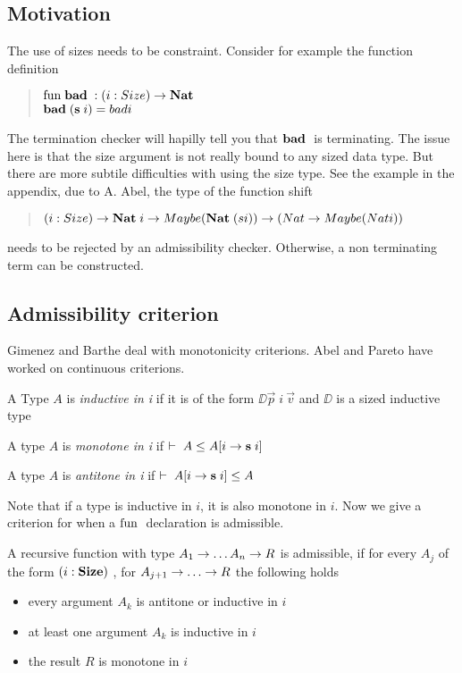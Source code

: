 \subsection{Motivation}
The use of sizes needs to be constraint.
Consider for example the function definition

\begin{quote}
$\mathrm{fun}\; \mathbf{bad}\; : ( i : Size ) \rightarrow \mathbf{Nat}\;$
\\
$\mathbf{bad}\; (\mathbf{s}\; i) = bad i $ 
\end{quote}
The termination checker will hapilly tell you that $\mathbf{bad}\;$ is terminating.
The issue here is that the size argument is not really bound to any sized data type.
But there are more subtile difficulties with using the size type.
See the example in the appendix, due to A. Abel,
the type of the function shift
\begin{quote}
$ ( i : Size ) \rightarrow \mathbf{Nat}\; i \rightarrow Maybe (\mathbf{Nat}\; (s i)) \rightarrow (Nat \rightarrow Maybe (Nat i)) $ 
\end{quote}
needs to be rejected by an admissibility checker.
Otherwise, a non terminating term can be constructed.
\subsection{Admissibility criterion}

Gimenez and Barthe deal with monotonicity criterions.
Abel and Pareto have worked on continuous criterions.
\begin{definition}
A Type $A$ is \emph{inductive in i} if it is of the form $ \DD \vec{p} \; i \: \vec{v} $ and $\DD$ is a sized inductive type
\end{definition}
\begin{definition}
A type $A$ is \emph{monotone in i} if $ \vdash\;A\leq A[i \rightarrow \mathbf{s}\; i ]$ 
\end{definition}
\begin{definition}
A type $A$ is \emph{antitone in i} if $ \vdash\;A[i \rightarrow \mathbf{s}\; i ]\leq A$ 
\end{definition}
Note that if a type is inductive in $i$, it is also monotone in $i$. 
Now we give a criterion for when a $\mathrm{fun}\;$ declaration is admissible.
\begin{definition}
A recursive function with type $ A_1 \rightarrow \dots A_n \rightarrow R $ is admissible, if
for every $A_j$ of the form $(i : \mathbf{Size} )$ , for $A_{j + 1} \ra \dots \ra R $ the following holds 
\begin{itemize}
\item
every argument $A_k$ is antitone or inductive in $i$
\item
at least one argument $A_k$ is inductive in $i$
\item
the result $R$ is monotone in $i$  
\end{itemize}
\end{definition}
